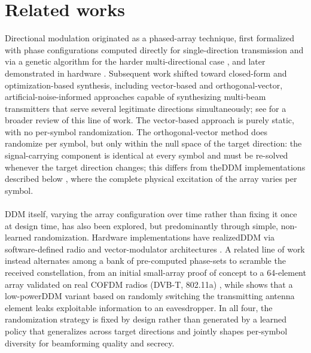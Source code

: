 \section{Related works}

Directional modulation originated as a phased-array technique, first formalized with phase configurations computed directly for single-direction transmission and via a genetic algorithm for the harder multi-directional case \cite{daly2009dm}, and later demonstrated in hardware \cite{daly2010demo}. Subsequent work shifted toward closed-form and optimization-based synthesis, including vector-based \cite{ding2014vector} and orthogonal-vector, artificial-noise-informed \cite{ding2015orthogonal} approaches capable of synthesizing multi-beam transmitters that serve several legitimate directions simultaneously; see \cite{ding2016review} for a broader review of this line of work. The vector-based approach \cite{ding2014vector} is purely static, with no per-symbol randomization. The orthogonal-vector method \cite{ding2015orthogonal} does randomize per symbol, but only within the null space of the target direction: the signal-carrying component is identical at every symbol and must be re-solved whenever the target direction changes; this differs from the\gls{DDM} implementations described below \cite{cabrerahernandez2019sdr,cabrerahernandez2019vm}, where the complete physical excitation of the array varies per symbol.\\
\\
\gls{DDM} itself, varying the array configuration over time rather than fixing it once at design time, has also been explored, but predominantly through simple, non-learned randomization. Hardware implementations have realized\gls{DDM} via software-defined radio \cite{cabrerahernandez2019sdr} and vector-modulator architectures \cite{cabrerahernandez2019vm}. A related line of work instead alternates among a bank of pre-computed phase-sets to scramble the received constellation, from an initial small-array proof of concept \cite{pellegrini2014crypto} to a 64-element array validated on real COFDM radios (DVB-T, 802.11a) \cite{pellegrini2018cofdm}, while \cite{goriasilva2023lpddm} shows that a low-power\gls{DDM} variant based on randomly switching the transmitting antenna element leaks exploitable information to an eavesdropper. In all four, the randomization strategy is fixed by design rather than generated by a learned policy that generalizes across target directions and jointly shapes per-symbol diversity for beamforming quality and secrecy.\\
